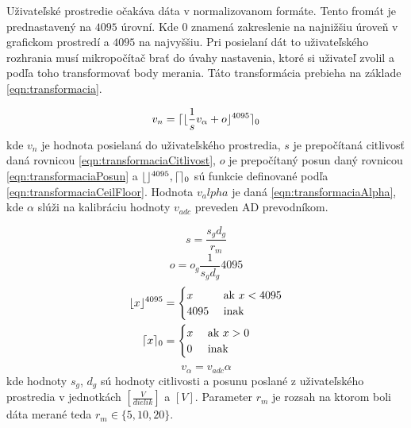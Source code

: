 \documentclass[main.tex]{subfiles}
\begin{document}
	Uživateľské prostredie očakáva dáta v normalizovanom formáte. Tento fromát je prednastavený na $4095$ úrovní. Kde $0$ znamená zakreslenie na najnižšiu úroveň v grafickom prostredí a $4095$ na najvyššiu. Pri posielaní dát to uživateľského rozhrania musí mikropočítač brať do úvahy nastavenia, ktoré si uživateľ zvolil a podľa toho transformovať body merania. Táto transformácia prebieha na základe \cref{eqn:transformacia}. 
	
	\begin{equation}
		v_n = \lceil\lfloor\frac{1}{s}v_\alpha + o\rfloor^{4095}\rceil_{0}
		\label{eqn:transformacia}
	\end{equation}
	kde $v_n$ je hodnota posielaná do uživateľského prostredia, $s$ je prepočítaná citlivosť daná rovnicou \cref{eqn:transformaciaCitlivost}, $o$ je prepočítaný posun daný rovnicou \cref{eqn:transformaciaPosun} a $\lfloor\rfloor^{4095}, \lceil\rceil_{0}$ sú funkcie definované podľa \cref{eqn:transformaciaCeilFloor}. Hodnota $v_alpha$ je daná \cref{eqn:transformaciaAlpha}, kde $\alpha$ slúži na kalibráciu hodnoty $v_{adc}$ preveden AD prevodníkom.
	
	\begin{equation}
		s = \frac{s_gd_g}{r_m}
		 \label{eqn:transformaciaCitlivost}
	\end{equation}
	\begin{equation}
		o = o_g\frac{1}{s_gd_g}4095
		\label{eqn:transformaciaPosun}
	\end{equation}
	\begin{equation}
		\begin{split}
			\lfloor x\rfloor^{4095} &= \begin{cases}
				x & \text{ ak } x < 4095 \\
				4095 & \text{ inak } \\
			\end{cases} \\
			\lceil x\rceil_{0} &= \begin{cases}
			x & \text{ ak } x > 0 \\
			0 & \text{ inak } \\
			\end{cases} \\
		\end{split}
	\label{eqn:transformaciaCeilFloor}
	\end{equation}
	\begin{equation}
 	v_{\alpha} = v_{adc} \alpha
	\label{eqn:transformaciaAlpha}
	\end{equation}
	kde hodnoty $s_g$, $d_g$ sú hodnoty citlivosti a posunu poslané z uživateľského prostredia v jednotkách $[\frac{V}{dielik}]$ a $[V]$. Parameter $r_m$ je rozsah na ktorom boli dáta merané teda $r_m \in \{5,10,20\}$.
	
	
	
\end{document}
